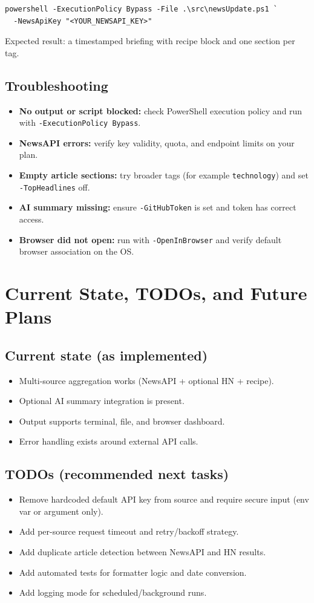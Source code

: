 \documentclass[11pt,a4paper]{article}
\begin{document}
\begin{verbatim}
powershell -ExecutionPolicy Bypass -File .\src\newsUpdate.ps1 `
  -NewsApiKey "<YOUR_NEWSAPI_KEY>"
\end{verbatim}

Expected result: a timestamped briefing with recipe block and one section per tag.

\subsection{Troubleshooting}
\begin{itemize}
  \item \textbf{No output or script blocked:} check PowerShell execution policy and run with \texttt{-ExecutionPolicy Bypass}.
  \item \textbf{NewsAPI errors:} verify key validity, quota, and endpoint limits on your plan.
  \item \textbf{Empty article sections:} try broader tags (for example \texttt{technology}) and set \texttt{-TopHeadlines} off.
  \item \textbf{AI summary missing:} ensure \texttt{-GitHubToken} is set and token has correct access.
  \item \textbf{Browser did not open:} run with \texttt{-OpenInBrowser} and verify default browser association on the OS.
\end{itemize}

\section{Current State, TODOs, and Future Plans}
\subsection{Current state (as implemented)}
\begin{itemize}
  \item Multi-source aggregation works (NewsAPI + optional HN + recipe).
  \item Optional AI summary integration is present.
  \item Output supports terminal, file, and browser dashboard.
  \item Error handling exists around external API calls.
\end{itemize}

\subsection{TODOs (recommended next tasks)}
\begin{itemize}
  \item Remove hardcoded default API key from source and require secure input (env var or argument only).
  \item Add per-source request timeout and retry/backoff strategy.
  \item Add duplicate article detection between NewsAPI and HN results.
  \item Add automated tests for formatter logic and date conversion.
  \item Add logging mode for scheduled/background runs.
\end{itemize}
\end{document}
